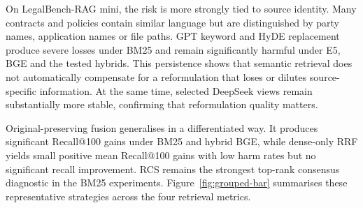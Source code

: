 \documentclass[a4paper,fleqn]{cas-dc}
\begin{document}
On LegalBench-RAG mini, the risk is more strongly tied to source
identity. Many contracts and policies contain similar language
but are distinguished by party names, application names or file
paths. GPT keyword and HyDE replacement produce severe losses
under BM25 and remain significantly harmful under E5, BGE and
the tested hybrids. This persistence shows that semantic
retrieval does not automatically compensate for a reformulation
that loses or dilutes source-specific information. At the same
time, selected DeepSeek views remain substantially more stable,
confirming that reformulation quality matters.

Original-preserving fusion generalises in a differentiated way.
It produces significant Recall@100 gains under BM25 and hybrid
BGE, while dense-only RRF yields small positive mean Recall@100
gains with low harm rates but no significant recall improvement.
RCS remains the strongest top-rank consensus diagnostic in the
BM25 experiments. Figure~\ref{fig:grouped-bar} summarises these
representative strategies across the four retrieval metrics.

\begin{table}[t]
\centering
\caption{Cross-dataset and cross-retriever summary of key
results and design implications.}
\label{tab:cross-dataset}
\end{table}
\end{document}
